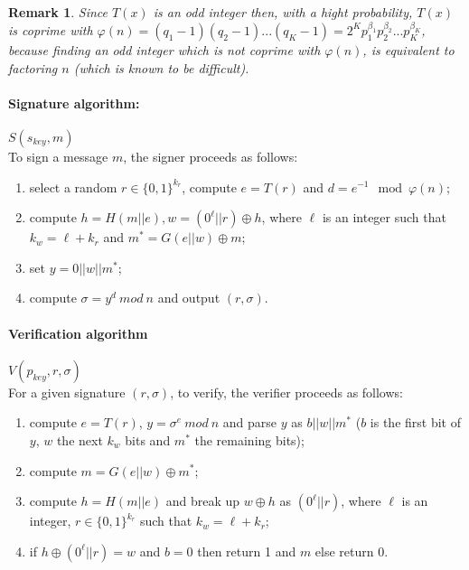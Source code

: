\documentclass[a4paper,11pt]{article}
\newtheorem{remark}[theorem]{Remark}
\begin{document}
\begin{remark}
Since $T(x)$ is an odd integer then, with a hight probability, $T(x)$ is coprime with $\varphi(n)=(q_1-1)(q_2-1)...(q_K-1)=2^Kp^{\beta_{1}}_{1}p^{\beta_{2}}_{2}...p^{\beta_{K}}_{K}$, because finding an odd integer which is not coprime with $\varphi(n)$, is equivalent to factoring $n$ (which is known to be difficult).
\end{remark}

\paragraph{Signature algorithm:}  $S(s_{key},  m)$\\
To sign a message $m$, the signer proceeds as follows:
\begin{enumerate}
\item select a random $r\in\{0,1\}^{k_r}$, compute $e=T(r)$ and $d=e^{-1} \mod \varphi(n)$;
\item compute $h=H(m||e), w=(0^{\ell}||r)\oplus h$, where $\ell$ is an integer such that $k_w=\ell +k_r$ and $m^*=G(e||w)\oplus m$;
\item set $y= 0||w||m^*$;
\item compute $\sigma = y^d \ mod \ n $ and output $(r,\sigma)$.
\end{enumerate}

\paragraph{Verification algorithm}  $V(p_{key},r,\sigma)$\\
For a given signature $(r,\sigma)$, to verify, the verifier proceeds as follows:
\begin{enumerate}
\item compute $e=T(r)$, $y= \sigma^e \ mod \ n$ and parse $y$ as $b||w||m^*$ ($b$ is the first bit of $y$,  $w$ the next $k_w$ bits and $m^*$ the remaining bits);
\item compute $m= G(e||w)\oplus m^*$;
\item compute $h=H(m||e)$ and  break up $w\oplus h$ as $(0^\ell||r)$, where $\ell$ is an integer, $r\in\{0,1\}^{k_r}$ such that $k_w=\ell+k_r$;
\item if $h\oplus (0^{\ell}||r)=w$ and $b=0$ then return 1 and $m$
else return 0.
\end{enumerate}


\end{document}
